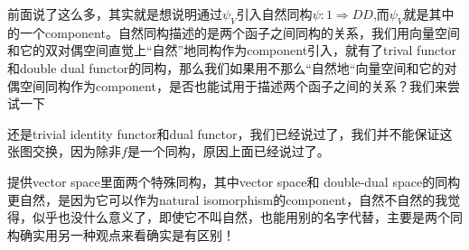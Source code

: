 \documentclass[UTF8,11pt,a4paper]{ctexart}%
\begin{document}
\begin{center}
\end{center}

前面说了这么多，其实就是想说明通过$\psi_{V}$引入自然同构$\psi\colon 1 \Rightarrow DD$,而$\psi_{V}$就是其中的一个component。自然同构描述的是两个函子之间同构的关系，我们用向量空间和它的双对偶空间直觉上“自然”地同构作为component引入，就有了trival functor和double dual functor的同构，那么我们如果用不那么“自然地“向量空间和它的对偶空间同构作为component，是否也能试用于描述两个函子之间的关系？我们来尝试一下

\begin{center}
\end{center}

还是trivial identity functor和dual functor，我们已经说过了，我们并不能保证这张图交换，因为除非$f$是一个同构，原因上面已经说过了。


提供vector space里面两个特殊同构，其中vector space和 double-dual space的同构更自然，是因为它可以作为natural isomorphism的component，自然不自然的我觉得，似乎也没什么意义了，即使它不叫自然，也能用别的名字代替，主要是两个同构确实用另一种观点来看确实是有区别！
\end{document}
